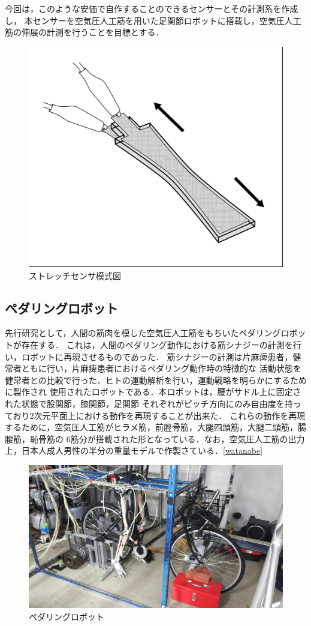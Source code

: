 今回は，このような安価で自作することのできるセンサーとその計測系を作成し，
本センサーを空気圧人工筋を用いた足関節ロボットに搭載し，空気圧人工筋の伸展の計測を行うことを目標とする．
\begin{figure}[h]
    \begin{center}
        \includegraphics[width=0.5\columnwidth]{./1_prolusion/MITSoftRobotics.eps}
        \caption{ストレッチセンサ模式図\cite{MITSoftRobot}}
        \label{MITSoftRobot表紙}
    \end{center}
\end{figure}

\subsection{ペダリングロボット}

先行研究として，人間の筋肉を模した空気圧人工筋をもちいたペダリングロボットが存在する．
これは，人間のペダリング動作における筋シナジーの計測を行い，ロボットに再現させるものであった．
筋シナジーの計測は片麻痺患者，健常者ともに行い，片麻痺患者におけるペダリング動作時の特徴的な
活動状態を健常者との比較で行った．ヒトの運動解析を行い，運動戦略を明らかにするために製作され
使用されたロボットである．本ロボットは，腰がサドル上に固定された状態で股関節，膝関節，足関節
それぞれがピッチ方向にのみ自由度を持っており2次元平面上における動作を再現することが出来た．
これらの動作を再現するために，空気圧人工筋がヒラメ筋，前脛骨筋，大腿四頭筋，大腿二頭筋，腸腰筋，恥骨筋の
6筋分が搭載された形となっている．なお，空気圧人工筋の出力上，日本人成人男性の半分の重量モデルで作製さている．\ref{watanabe}
\begin{figure}[h]
 \begin{center}
  \includegraphics[width=0.75\columnwidth,clip]{./1_prolusion/1st.eps}
  \caption{ペダリングロボット}
  \label{初号機}
  \end{center}
\end{figure}

